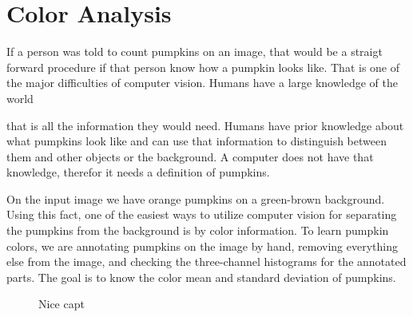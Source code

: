 \documentclass[../Head/Main.tex]{subfiles}
\begin{document}
\section{Color Analysis}

If a person was told to count pumpkins on an image, that would be a straigt forward procedure if that person know how a pumpkin looks like. 
That is one of the major difficulties of computer vision. Humans have a large knowledge of the world


that is all the information they would need.
Humans have prior knowledge about what pumpkins look like and can use that information to distinguish between them and other objects or the background.
A computer does not have that knowledge, therefor it needs a definition of pumpkins.

On the input image we have orange pumpkins on a green-brown background.
Using this fact, one of the easiest ways to utilize computer vision for separating the pumpkins from the background is by color information.
To learn pumpkin colors, we are annotating pumpkins on the image by hand, removing everything else from the image, and checking the three-channel histograms for the annotated parts.
The goal is to know the color mean and standard deviation of pumpkins.

\begin{figure}[H]
	\centering
	\scalebox{0.9}{
	}
	\caption{Nice capt}
	\label{fig:color_mean}
\end{figure}
\end{document}
